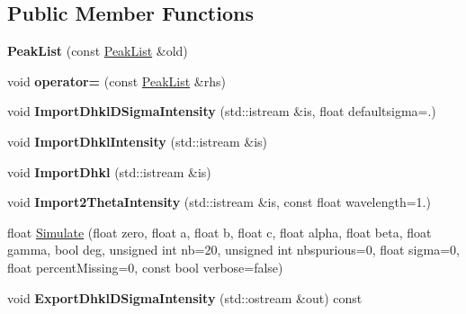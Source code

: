 \subsection*{Public Member Functions}
\begin{DoxyCompactItemize}
\item 
\mbox{\label{class_obj_cryst_1_1_peak_list_a61c463b62f2ef45451dc873e2903e9c8}} 
{\bfseries Peak\+List} (const \mbox{\hyperlink{class_obj_cryst_1_1_peak_list}{Peak\+List}} \&old)
\item 
\mbox{\label{class_obj_cryst_1_1_peak_list_a47e535574bdbcf7017b24b5154cf6251}} 
void {\bfseries operator=} (const \mbox{\hyperlink{class_obj_cryst_1_1_peak_list}{Peak\+List}} \&rhs)
\item 
\mbox{\label{class_obj_cryst_1_1_peak_list_ac4373f4302ba0767cc957e64da9d9c00}} 
void {\bfseries Import\+Dhkl\+D\+Sigma\+Intensity} (std\+::istream \&is, float defaultsigma=.)
\item 
\mbox{\label{class_obj_cryst_1_1_peak_list_a10fba158184bcfd1b19a7ec524641123}} 
void {\bfseries Import\+Dhkl\+Intensity} (std\+::istream \&is)
\item 
\mbox{\label{class_obj_cryst_1_1_peak_list_a50cad4f19639264f93f153775824dcdd}} 
void {\bfseries Import\+Dhkl} (std\+::istream \&is)
\item 
\mbox{\label{class_obj_cryst_1_1_peak_list_a84f1e73d15c57b5e0cabd543b1b340c4}} 
void {\bfseries Import2\+Theta\+Intensity} (std\+::istream \&is, const float wavelength=1.)
\item 
float \mbox{\hyperlink{class_obj_cryst_1_1_peak_list_a88b5e22d20e07c1392b7b3916a9f58fe}{Simulate}} (float zero, float a, float b, float c, float alpha, float beta, float gamma, bool deg, unsigned int nb=20, unsigned int nbspurious=0, float sigma=0, float percent\+Missing=0, const bool verbose=false)
\item 
\mbox{\label{class_obj_cryst_1_1_peak_list_a43b81cdb8b942815ce3c0c2a99344ff8}} 
void {\bfseries Export\+Dhkl\+D\+Sigma\+Intensity} (std\+::ostream \&out) const

\end{DoxyCompactItemize}
